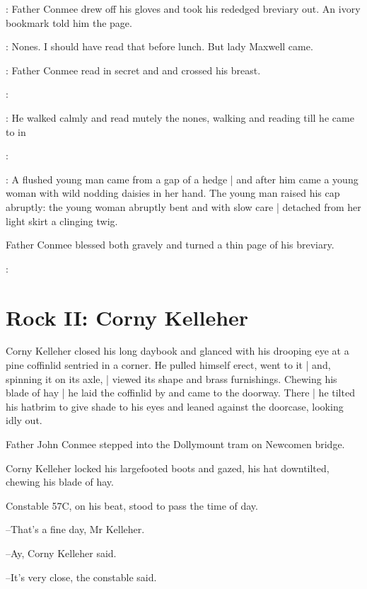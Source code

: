 :
Father Conmee drew off his gloves
and took his rededged breviary out.
An ivory bookmark told him the page.

\conmeeint:
Nones.
I should have read that before lunch.
But lady Maxwell came.

:
Father Conmee read in secret  and 
and crossed his breast.

\conmeeint:

:
He walked calmly and read mutely the nones,
walking and reading till
he came to
 in

\conmeeint:

:
A flushed young man came from a gap of a hedge |
and after him came a young woman
with wild nodding daisies in her hand.
The young man raised his cap abruptly:
the young woman abruptly bent
and with slow care |
detached from her light skirt a clinging twig.

Father Conmee blessed both gravely
and turned a thin page of his breviary.

\conmeeint:


\section*{Rock II: Corny Kelleher}


Corny Kelleher closed his long daybook
and glanced with his drooping eye
at a pine coffinlid sentried in a corner.
He pulled himself erect, went to it |
and, spinning it on its axle, |
viewed its shape and brass furnishings.
Chewing his blade of hay |
he laid the coffinlid by and came to the doorway.
There |
he tilted his hatbrim to give shade to his eyes
and leaned against the doorcase,
looking idly out.

Father John Conmee stepped into the Dollymount tram on Newcomen bridge.

Corny Kelleher locked his largefooted boots and gazed,
his hat downtilted,
chewing his blade of hay.

Constable 57C,
on his beat,
stood to pass the time of day.

--That's a fine day, Mr Kelleher.

--Ay, Corny Kelleher said.

--It's very close,
the constable said.

